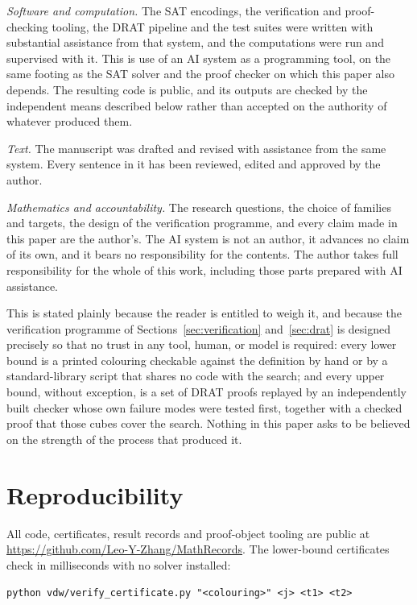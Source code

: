 \documentclass[12pt]{article}
\theoremstyle{remark}
\begin{document}
\emph{Software and computation.} The SAT encodings, the verification and
proof-checking tooling, the DRAT pipeline and the test suites were written
with substantial assistance from that system, and the computations were run
and supervised with it. This is use of an AI system as a programming tool, on
the same footing as the SAT solver and the proof checker on which this paper
also depends. The resulting code is public, and its outputs are checked by
the independent means described below rather than accepted on the authority
of whatever produced them.

\emph{Text.} The manuscript was drafted and revised with assistance from the
same system. Every sentence in it has been reviewed, edited and approved by
the author.

\emph{Mathematics and accountability.} The research questions, the choice of
families and targets, the design of the verification programme, and every
claim made in this paper are the author's. The AI system is not an author, it
advances no claim of its own, and it bears no responsibility for the
contents. The author takes full responsibility for the whole of this work,
including those parts prepared with AI assistance.

This is stated plainly because the reader is entitled to weigh it, and
because the verification programme of
Sections~\ref{sec:verification} and~\ref{sec:drat} is designed precisely so
that no trust in any tool, human, or model is required: every lower bound is
a printed colouring checkable against the definition by hand or by a
standard-library script that shares no code with the search; and every upper
bound, without exception, is a set of DRAT proofs replayed by an
independently built checker whose own failure modes were tested first,
together with a checked proof that those cubes cover the search. Nothing in
this paper asks to be believed on the strength of the process that produced
it.

\section{Reproducibility}\label{sec:repro}

All code, certificates, result records and proof-object tooling are public
at \url{https://github.com/Leo-Y-Zhang/MathRecords}. The lower-bound
certificates check in milliseconds with no solver installed:

\begin{center}\small
\texttt{python vdw/verify\_certificate.py "<colouring>" <j> <t1> <t2>}
\end{center}
\end{document}
